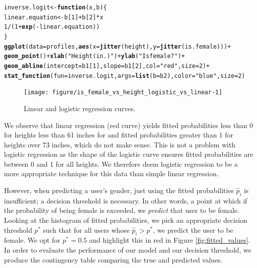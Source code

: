 \documentclass{article}\usepackage[]{graphicx}\usepackage[]{color}
\makeatletter
\newcommand{\hlnum}[1]{\textcolor[rgb]{0.686,0.059,0.569}{#1}}%
\newcommand{\hlstr}[1]{\textcolor[rgb]{0.192,0.494,0.8}{#1}}%
\newcommand{\hlopt}[1]{\textcolor[rgb]{0,0,0}{#1}}%
\newcommand{\hlstd}[1]{\textcolor[rgb]{0.345,0.345,0.345}{#1}}%
\newcommand{\hlkwa}[1]{\textcolor[rgb]{0.161,0.373,0.58}{\textbf{#1}}}%
\newcommand{\hlkwb}[1]{\textcolor[rgb]{0.69,0.353,0.396}{#1}}%
\newcommand{\hlkwc}[1]{\textcolor[rgb]{0.333,0.667,0.333}{#1}}%
\newcommand{\hlkwd}[1]{\textcolor[rgb]{0.737,0.353,0.396}{\textbf{#1}}}%
\newenvironment{kframe}{%
 \def\at@end@of@kframe{}%
 \ifinner\ifhmode%
  \def\at@end@of@kframe{\end{minipage}}%
  \begin{minipage}{\columnwidth}%
 \fi\fi%
 \def\FrameCommand##1{\hskip\@totalleftmargin \hskip-\fboxsep
 \colorbox{shadecolor}{##1}\hskip-\fboxsep
     \hskip-\linewidth \hskip-\@totalleftmargin \hskip\columnwidth}%
 \MakeFramed {\advance\hsize-\width
   \@totalleftmargin\z@ \linewidth\hsize
   \@setminipage}}%
 {\par\unskip\endMakeFramed%
 \at@end@of@kframe}
\newenvironment{knitrout}{}{} %
\makeatother
\begin{document}
\begin{knitrout}
\color{fgcolor}\begin{kframe}
\begin{alltt}
\hlstd{inverse.logit} \hlkwb{<-} \hlkwa{function}\hlstd{(}\hlkwc{x}\hlstd{,} \hlkwc{b}\hlstd{)\{}
  \hlstd{linear.equation} \hlkwb{<-} \hlstd{b[}\hlnum{1}\hlstd{]} \hlopt{+} \hlstd{b[}\hlnum{2}\hlstd{]}\hlopt{*}\hlstd{x}
  \hlnum{1}\hlopt{/}\hlstd{(}\hlnum{1}\hlopt{+}\hlkwd{exp}\hlstd{(}\hlopt{-}\hlstd{linear.equation))}
\hlstd{\}}
\hlkwd{ggplot}\hlstd{(}\hlkwc{data}\hlstd{=profiles,} \hlkwd{aes}\hlstd{(}\hlkwc{x}\hlstd{=}\hlkwd{jitter}\hlstd{(height),} \hlkwc{y}\hlstd{=}\hlkwd{jitter}\hlstd{(is.female)))} \hlopt{+}
  \hlkwd{geom_point}\hlstd{()} \hlopt{+} \hlkwd{xlab}\hlstd{(}\hlstr{"Height (in.)"}\hlstd{)} \hlopt{+} \hlkwd{ylab}\hlstd{(}\hlstr{"Is female?"}\hlstd{)} \hlopt{+}
  \hlkwd{geom_abline}\hlstd{(}\hlkwc{intercept}\hlstd{=b1[}\hlnum{1}\hlstd{],} \hlkwc{slope}\hlstd{=b1[}\hlnum{2}\hlstd{],} \hlkwc{col}\hlstd{=}\hlstr{"red"}\hlstd{,} \hlkwc{size}\hlstd{=}\hlnum{2}\hlstd{)} \hlopt{+}
  \hlkwd{stat_function}\hlstd{(}\hlkwc{fun} \hlstd{= inverse.logit,} \hlkwc{args}\hlstd{=}\hlkwd{list}\hlstd{(}\hlkwc{b}\hlstd{=b2),} \hlkwc{color}\hlstd{=}\hlstr{"blue"}\hlstd{,} \hlkwc{size}\hlstd{=}\hlnum{2}\hlstd{)}
\end{alltt}
\end{kframe}\begin{figure}

{\centering \texttt{[image: figure/is\_female\_vs\_height\_logistic\_vs\_linear-1]} 

}

\caption[Linear and logistic regression curves]{Linear and logistic regression curves.}\label{fig:is_female_vs_height_logistic_vs_linear}
\end{figure}


\end{knitrout}

We observe that linear regression (red curve) yields fitted probabilities less than 0 for heights less than 61 inches for and fitted probabilities greater than 1 for heights over 73 inches, which do not make sense.  This is not a problem with logistic regression as the shape of the logistic curve ensures fitted probabilities are between 0 and 1 for all heights.   We therefore deem logistic regression to be a more appropriate technique for this data than simple linear regression.

However, when predicting a user's gender, just using the fitted probabilities $\widehat{p}_i$ is insufficient; a decision threshold is necessary.  In other words, a point at which if the probability of being female is exceeded, we \textit{predict} that user to be female.  Looking at the histogram of fitted probabilities, we pick an appropriate decision threshold $p^*$ such that for all users whose $\widehat{p}_i > p^*$, we predict the user to be female.  We opt for $p^* = 0.5$ and highlight this in red in Figure \ref{fig:fitted_values}.  In order to evaluate the performance of our model and our decision threshold, we produce the contingency table comparing the true and predicted values.
\end{document}
